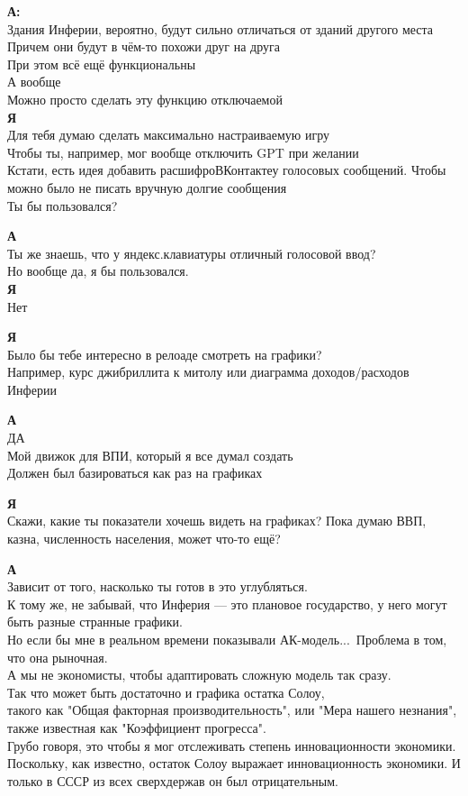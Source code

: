 \textbf{А:}\\
Здания Инферии, вероятно, будут сильно отличаться от зданий другого места\\
Причем они будут в чём-то похожи друг на друга\\
При этом всё ещё функциональны\\
А вообще\\
Можно просто сделать эту функцию отключаемой\\

\textbf{Я}\\
Для тебя думаю сделать максимально настраиваемую игру\\
Чтобы ты, например, мог вообще отключить GPT при желании\\
Кстати, есть идея добавить расшифроВКонтактеу голосовых сообщений. Чтобы можно было не писать вручную долгие сообщения\\
Ты бы пользовался?

\textbf{А}\\
Ты же знаешь, что у яндекс.клавиатуры отличный голосовой ввод?\\
Но вообще да, я бы пользовался.\\

\textbf{Я}\\
Нет

\textbf{Я}\\
Было бы тебе интересно в релоаде смотреть на графики?\\
Например, курс джибриллита к митолу или диаграмма доходов/расходов Инферии

\textbf{А}\\
ДА\\
Мой движок для ВПИ, который я все думал создать\\
Должен был базироваться как раз на графиках

\textbf{Я}\\
Скажи, какие ты показатели хочешь видеть на графиках? Пока думаю ВВП, казна, численность населения, может что-то ещё?

\textbf{А}\\
Зависит от того, насколько ты готов в это углубляться.\\
К тому же, не забывай, что Инферия — это плановое государство, у него могут быть разные странные графики.\\
Но если бы мне в реальном времени показывали АК-модель...\
Проблема в том, что она рыночная.\\
А мы не экономисты, чтобы адаптировать сложную модель так сразу.\\
Так что может быть достаточно и графика остатка Солоу,\\
такого как "Общая факторная производительность", или "Мера нашего незнания", также известная как "Коэффициент прогресса".\\
Грубо говоря, это чтобы я мог отслеживать степень инновационности экономики.\\
Поскольку, как известно, остаток Солоу выражает инновационность экономики. И только в СССР из всех сверхдержав он был отрицательным.\\

